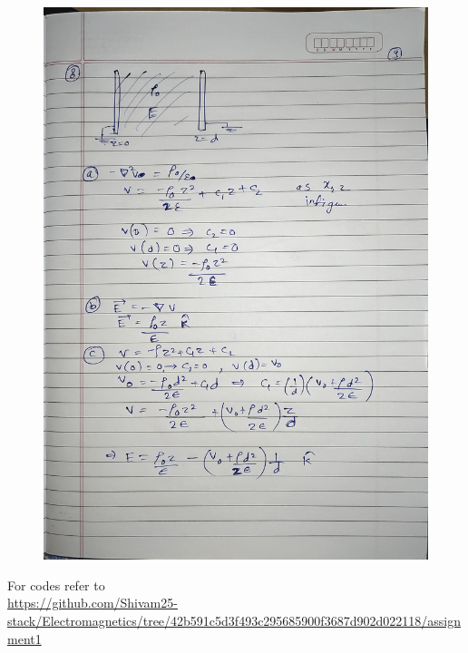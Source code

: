 \documentclass{article}
\begin{document}
\begin{figure}[H]
    \centering
    \includegraphics[width=\textwidth]{figs/written/9.jpg}
\end{figure}
For codes refer to \\
\url{https://github.com/Shivam25-stack/Electromagnetics/tree/42b591c5d3f493c295685900f3687d902d022118/assignment1}
\end{document}
